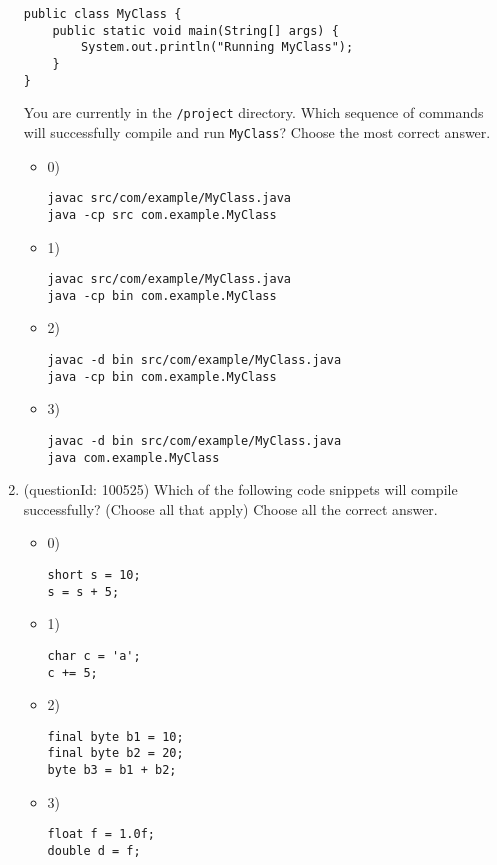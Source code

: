 \documentclass[12pt]{article}
\begin{document}
\begin{enumerate}[label=(\arabic*)]
\begin{verbatim}
public class MyClass {
    public static void main(String[] args) {
        System.out.println("Running MyClass");
    }
}
\end{verbatim}
You are currently in the \verb|/project| directory. Which sequence of commands will successfully compile and run \verb|MyClass|?
Choose the most correct answer. 
\begin{itemize}
\item 0) \begin{verbatim}
javac src/com/example/MyClass.java
java -cp src com.example.MyClass
\end{verbatim}

\item 1) \begin{verbatim}
javac src/com/example/MyClass.java
java -cp bin com.example.MyClass
\end{verbatim}

\item 2) \begin{verbatim}
javac -d bin src/com/example/MyClass.java
java -cp bin com.example.MyClass
\end{verbatim}

\item 3) \begin{verbatim}
javac -d bin src/com/example/MyClass.java
java com.example.MyClass
\end{verbatim}

\end{itemize}
\item (questionId: 100525) Which of the following code snippets will compile successfully? (Choose all that apply)
Choose all the correct answer.\begin{itemize}
\item 0) \begin{verbatim}
short s = 10;
s = s + 5;
\end{verbatim}

\item 1) \begin{verbatim}
char c = 'a';
c += 5;
\end{verbatim}

\item 2) \begin{verbatim}
final byte b1 = 10;
final byte b2 = 20;
byte b3 = b1 + b2;
\end{verbatim}

\item 3) \begin{verbatim}
float f = 1.0f;
double d = f;
\end{verbatim}


\end{itemize}
\end{enumerate}
\end{document}

